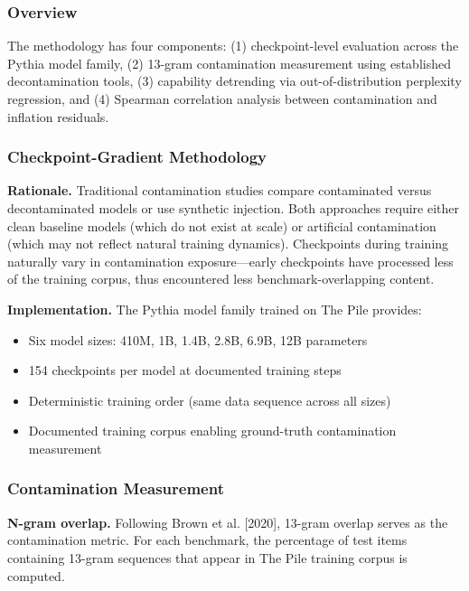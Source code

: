 
\subsubsection{Overview}

The methodology has four components: (1) checkpoint-level evaluation across the Pythia model family, (2) 13-gram contamination measurement using established decontamination tools, (3) capability detrending via out-of-distribution perplexity regression, and (4) Spearman correlation analysis between contamination and inflation residuals.

\subsubsection{Checkpoint-Gradient Methodology}

\textbf{Rationale.} Traditional contamination studies compare contaminated versus decontaminated models or use synthetic injection. Both approaches require either clean baseline models (which do not exist at scale) or artificial contamination (which may not reflect natural training dynamics). Checkpoints during training naturally vary in contamination exposure---early checkpoints have processed less of the training corpus, thus encountered less benchmark-overlapping content.

\textbf{Implementation.} The Pythia model family \citep{biderman2023pythia} trained on The Pile \citep{gao2020pile} provides:
\begin{itemize}
\item Six model sizes: 410M, 1B, 1.4B, 2.8B, 6.9B, 12B parameters
\item 154 checkpoints per model at documented training steps
\item Deterministic training order (same data sequence across all sizes)
\item Documented training corpus enabling ground-truth contamination measurement
\end{itemize}

\subsubsection{Contamination Measurement}

\textbf{N-gram overlap.} Following Brown et al. [2020], 13-gram overlap serves as the contamination metric. For each benchmark, the percentage of test items containing 13-gram sequences that appear in The Pile training corpus is computed.

